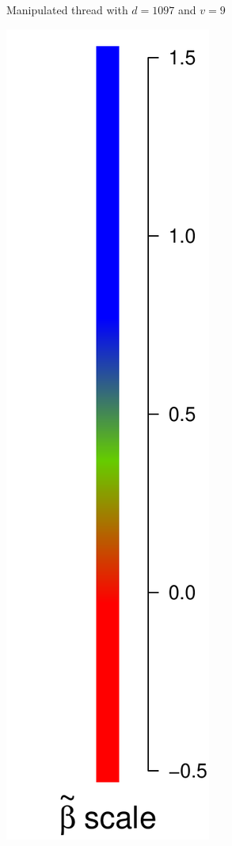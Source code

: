 \documentclass[a4paper,12pt]{article}
\begin{document}
\begin{figure}[!ht]
\begin{subfigure}[t]{.44\linewidth}
		\caption{\footnotesize Manipulated thread with $d=1097$ and $v=9$}
		\label{fig: m d=1097, v=9}
	\end{subfigure}
	\begin{subfigure}[t]{.1\linewidth}
		\centering
		\includegraphics[width=1\linewidth]{betascale.pdf}

\end{subfigure}
\end{figure}
\end{document}
